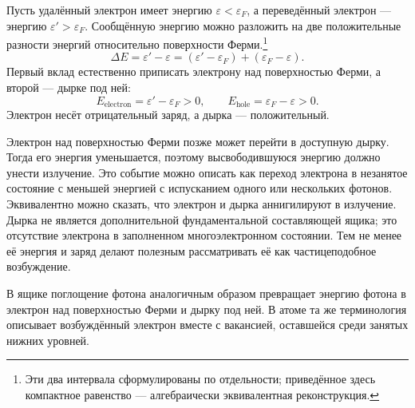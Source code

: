 Пусть удалённый электрон имеет энергию \(\varepsilon<\varepsilon_F\), а переведённый электрон — энергию \(\varepsilon'>\varepsilon_F\). Сообщённую энергию можно разложить на две положительные разности энергий относительно поверхности Ферми.\footnote{Эти два интервала сформулированы по отдельности; приведённое здесь компактное равенство — алгебраически эквивалентная реконструкция.}
\begin{equation}
\Delta E
=\varepsilon'-\varepsilon
=(\varepsilon'-\varepsilon_F)+(\varepsilon_F-\varepsilon).
\end{equation}
Первый вклад естественно приписать электрону над поверхностью Ферми, а второй — дырке под ней:
\begin{equation}
E_{\mathrm{electron}}=\varepsilon'-\varepsilon_F>0,
\qquad
E_{\mathrm{hole}}=\varepsilon_F-\varepsilon>0.
\end{equation}
Электрон несёт отрицательный заряд, а дырка — положительный.

Электрон над поверхностью Ферми позже может перейти в доступную дырку. Тогда его энергия уменьшается, поэтому высвободившуюся энергию должно унести излучение. Это событие можно описать как переход электрона в незанятое состояние с меньшей энергией с испусканием одного или нескольких фотонов. Эквивалентно можно сказать, что электрон и дырка аннигилируют в излучение. Дырка не является дополнительной фундаментальной составляющей ящика; это отсутствие электрона в заполненном многоэлектронном состоянии. Тем не менее её энергия и заряд делают полезным рассматривать её как частицеподобное возбуждение.

\begin{classroomqa}
\end{classroomqa}

В ящике поглощение фотона аналогичным образом превращает энергию фотона в электрон над поверхностью Ферми и дырку под ней. В атоме та же терминология описывает возбуждённый электрон вместе с вакансией, оставшейся среди занятых нижних уровней.

